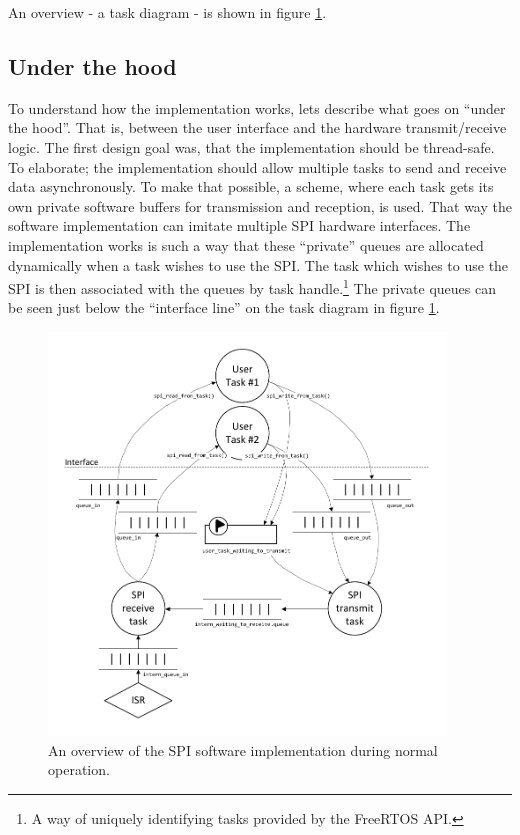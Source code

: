 An overview - a task diagram - is shown in figure \ref{fig:spi_task_diagram}.



\subsection{Under the hood}\label{sec:spi_underthehood}
To understand how the implementation works, lets describe what goes on ``under the hood''. That is, between the user interface and the hardware transmit/receive logic. The first design goal was, that the implementation should be thread-safe. To elaborate; the implementation should allow multiple tasks to send and receive data asynchronously. To make that possible, a scheme, where each task gets its own private software buffers for transmission and reception, is used. That way the software implementation can imitate multiple SPI hardware interfaces. The implementation works is such a way that these ``private'' queues are allocated dynamically when a task wishes to use the SPI. The task which wishes to use the SPI is then associated with the queues by task handle.\footnote{A way of uniquely identifying tasks provided by the FreeRTOS API.} The private queues can be seen just below the ``interface line'' on the task diagram in figure \ref{fig:spi_task_diagram}.

\begin{figure}[htb]
  \centering
  \includegraphics[width=0.94\textwidth,clip,trim=0 15 0 15]{content/04_communication/figures/spi_task_diagram_running.pdf}
  \caption{An overview of the SPI software implementation during normal operation.}
  \label{fig:spi_task_diagram}
\end{figure}%


